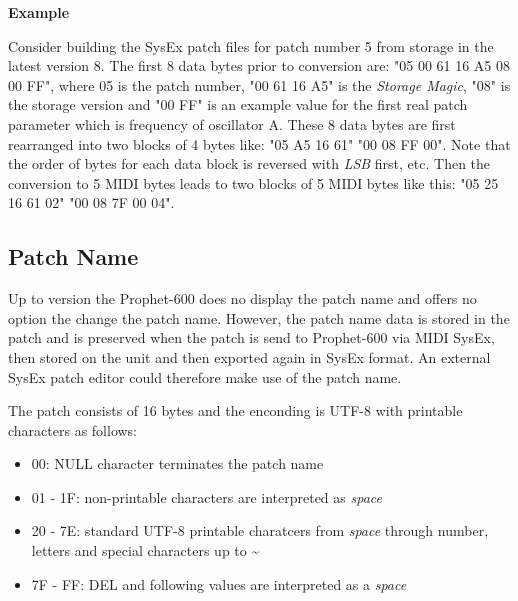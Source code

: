 \textbf{Example}

Consider building the SysEx patch files for patch number 5 from storage in the latest version 8. The first 8 data bytes prior to conversion are: "05 00 61 16 A5 08 00 FF", where 05 is the patch number, "00 61 16 A5" is the \textit{Storage Magic}, "08" is the storage version and "00 FF" is an example value for the first real patch parameter which is frequency of oscillator A. These 8 data bytes are first rearranged into two blocks of 4 bytes like: "05 A5 16 61" "00 08 FF 00". Note that the order of bytes for each data block is reversed with \textit{LSB} first, etc. Then the conversion to 5 MIDI bytes leads to two blocks of 5 MIDI bytes like this: "05 25 16 61 02" "00 08 7F 00 04".


\subsection{Patch Name}

Up to version \version the Prophet-600 does no display the patch name and offers no option the change the patch name. However, the patch name data is stored in the patch and is preserved when the patch is send to Prophet-600 via MIDI SysEx, then stored on the unit and then exported again in SysEx format. An external SysEx patch editor could therefore make use of the patch name.

The patch consists of 16 bytes and the enconding is UTF-8 with printable characters as follows:

\begin{itemize}
  \item 00: NULL character terminates the patch name
  \item 01 - 1F: non-printable characters are interpreted as \textit{space}
  \item 20 - 7E: standard UTF-8 printable charatcers from \textit{space} through number, letters and special characters up to \textasciitilde
  \item 7F - FF: DEL and following values are interpreted as a \textit{space}
\end{itemize}
 
